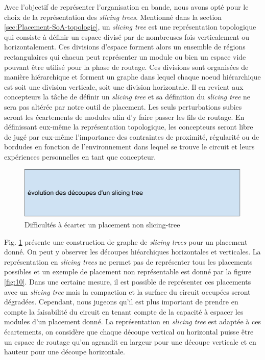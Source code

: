 Avec l'objectif de représenter l'organisation en bande, nous avons opté pour le choix de la représentation des \textit{slicing trees}. Mentionné dans la section \ref{sec:Placement-SoA-topologie}, un \textit{slicing tree} est une représentation topologique qui consiste à définir un espace divisé par de nombreuses fois verticalement ou horizontalement. Ces divisions d'espace forment alors un ensemble de régions rectangulaires qui chacun peut représenter un module ou bien un espace vide pouvant être utilisé pour la phase de routage. Ces divisions sont organisées de manière hiérarchique et forment un graphe dans lequel chaque noeud hiérarchique est soit une division verticale, soit une division horizontale. Il en revient aux concepteurs la tâche de définir un \textit{slicing tree} et sa définition du \textit{slicing tree} ne sera pas altérée par notre outil de placement. Les seuls perturbations subies seront les écartements de modules afin d'y faire passer les fils de routage. En définissant eux-même la représentation topologique, les concepteurs seront libre de jugé par eux-même l'importance des contraintes de proximité, régularité ou de bordudes en fonction de l'environnement dans lequel se trouve le circuit et leurs expériences personnelles en tant que concepteur.\newline
\begin{figure}[h]
\begin{center}
\includegraphics[height=0.10\textheight]{Figures/9.pdf}
\caption{Difficultés à écarter un placement non slicing-tree}
\label{fig:9}
\end{center}
\end{figure}\newline
\indent Fig. \ref{fig:9} présente une construction de graphe de \textit{slicing trees} pour un placement donné. On peut y observer les découpes hiéarchiques horizontales et verticales. La représentation en \textit{slicing trees} ne permet pas de représenter tous les placements possibles et un exemple de placement non représentable est donné par la figure \ref{fig:10}. Dans une certaine mesure, il est possible de représenter ces placements avec un \textit{slicing tree} mais la compaction et la surface du circuit occupées seront dégradées. Cependant, nous jugeons qu'il est plus important de prendre en compte la faisabilité du circuit en tenant compte de la capacité à espacer les modules d'un placement donné. La représentation en \textit{slicing tree} est adaptée à ces écartements, on considère que chaque découpe vertical ou horizontal puisse être un espace de routage qu'on agrandit en largeur pour une découpe verticale et en hauteur pour une découpe horizontale. \newline
